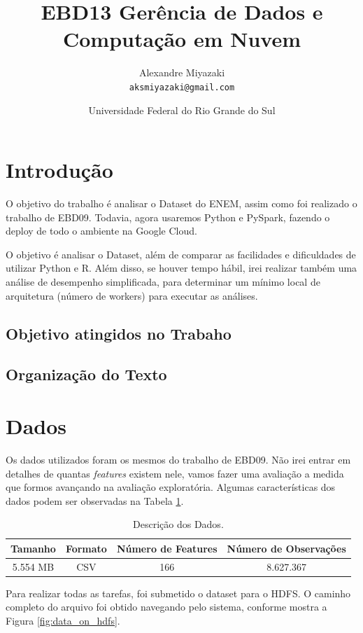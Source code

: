 \documentclass{article}
\title{EBD13 Gerência de Dados e Computação em Nuvem} %
\author{Alexandre Miyazaki\\ \texttt{aksmiyazaki@gmail.com}} %
\date{Universidade Federal do Rio Grande do Sul} %
\begin{document}
\maketitle %

\section{Introdução}
O objetivo do trabalho é analisar o Dataset do ENEM, assim como foi realizado o trabalho de EBD09. Todavia, agora usaremos Python e PySpark, fazendo o deploy de todo o ambiente na Google Cloud.

O objetivo é analisar o Dataset, além de comparar as facilidades e dificuldades de utilizar Python e R. Além disso, se houver tempo hábil, irei realizar também uma análise de desempenho simplificada, para determinar um mínimo local de arquitetura (número de workers) para executar as análises.


\subsection{Objetivo atingidos no Trabaho}

\subsection{Organização do Texto}

\newpage
\section{Dados}

Os dados utilizados foram os mesmos do trabalho de EBD09. Não irei entrar em detalhes de quantas \emph{features} existem nele, vamos fazer uma avaliação a medida que formos avançando na avaliação exploratória. Algumas características dos dados podem ser observadas na Tabela \ref{tab:data_data}.

\begin{table}[H]
\centering
\begin{tabular}{|c|c|c|c|}
\hline
Tamanho & Formato & Número de Features &  Número de Observações \\ \hline \hline
5.554 MB & CSV & 166 & 8.627.367 \\ \hline
\end{tabular}
\caption{Descrição dos Dados.}
\label{tab:data_data}
\end{table}

Para realizar todas as tarefas, foi submetido o dataset para o HDFS. O caminho completo do arquivo foi obtido navegando pelo sistema, conforme mostra a Figura \ref{fig:data_on_hdfs}.
\end{document}

